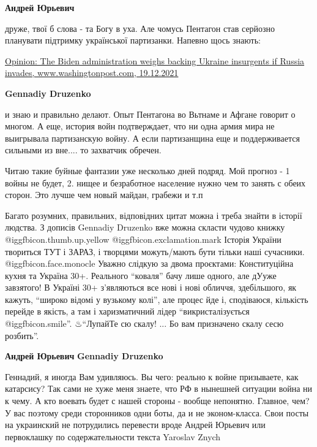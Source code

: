 \begin{itemize}
\begin{itemize} %
\textbf{Андрей Юрьевич} 

друже, твої б слова - та Богу в уха. Але чомусь Пентагон став серйозно
планувати підтримку української партизанки. Напевно щось знають:

\href{https://www.washingtonpost.com/opinions/2021/12/19/biden-ukraine-insurgents-russia}{%
Opinion: The Biden administration weighs backing Ukraine insurgents if Russia invades, %
www.washingtonpost.com, 19.12.2021%
}

\textbf{Gennadiy Druzenko} 

и знаю и правильно делают. Опыт Пентагона во Вьтнаме и Афгане говорит о многом.
А еще, история войн подтверждает, что ни одна армия мира не выигрывала
партизанскую войну. А если партизанщина еще и поддерживается сильными из
вне.... то захватчик обречен.

\end{itemize} %


Читаю такие буйные фантазии уже несколько дней подряд. Мой прогноз - 1 войны не
будет, 2. нищее и безработное население нужно чем то занять с обеих сторон. Это
лучше чем новый майдан, грабежи и т.п


Багато розумних, правильних, відповідних цитат можна і треба знайти в історії
людства. З дописів Gennadiy Druzenko вже можна скласти чудово книжку
@igg{fbicon.thumb.up.yellow} @igg{fbicon.exclamation.mark} Історія України
твориться ТУТ і ЗАРАЗ, і творцями можуть/мають бути тільки наші сучасники.
@igg{fbicon.face.monocle} Уважно слідкую за двома проєктами: Конституційна
кухня та Україна 30+. Реального \enquote{коваля} бачу лише одного, але дУуже
завзятого! В Україні 30+ з'являються все нові і нові обличчя, здебільшого, як
кажуть, \enquote{широко відомі у вузькому колі}, але процес йде і, сподіваюся,
кількість перейде в якість, а там і харизматичний лідер
\enquote{викристалізується @igg{fbicon.smile}}. ♨\enquote{ЛупайТе сю скалу! ...
Бо вам призначено скалу сесю розбить}.

\textbf{Андрей Юрьевич}
\textbf{Gennadiy Druzenko} 

Геннадий, я иногда Вам удивляюсь. Вы чего: реально к войне призываете, как
катарсису? Так сами не хуже меня знаете, что РФ в нынешней ситуации война ни к
чему. А кто воевать будет с нашей стороны - вообще непонятно. Главное, чем? У
вас поэтому среди сторонников одни боты, да и не эконом-класса. Свои посты на
украинский не потрудились перевести вроде Андрей Юрьевич или первоклашку по
содержательности текста Yaroslav Znych

\end{itemize} %
